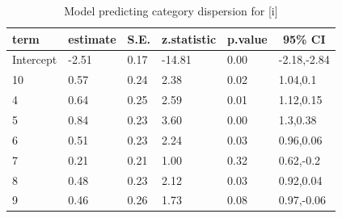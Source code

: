 \documentclass[
]{article}
\begin{document}
\begin{table}[tbp]

\begin{center}
\begin{threeparttable}

\caption{\label{tab:RMS-model-tbl-i}Model predicting category dispersion for [i]}

\begin{tabular}{llllll}
\toprule
term & \multicolumn{1}{c}{estimate} & \multicolumn{1}{c}{S.E.} & \multicolumn{1}{c}{z.statistic} & \multicolumn{1}{c}{p.value} & \multicolumn{1}{c}{95\% CI}\\
\midrule
Intercept & -2.51 & 0.17 & -14.81 & 0.00 & -2.18,-2.84\\
10 & 0.57 & 0.24 & 2.38 & 0.02 & 1.04,0.1\\
4 & 0.64 & 0.25 & 2.59 & 0.01 & 1.12,0.15\\
5 & 0.84 & 0.23 & 3.60 & 0.00 & 1.3,0.38\\
6 & 0.51 & 0.23 & 2.24 & 0.03 & 0.96,0.06\\
7 & 0.21 & 0.21 & 1.00 & 0.32 & 0.62,-0.2\\
8 & 0.48 & 0.23 & 2.12 & 0.03 & 0.92,0.04\\
9 & 0.46 & 0.26 & 1.73 & 0.08 & 0.97,-0.06\\
\bottomrule
\end{tabular}

\end{threeparttable}
\end{center}

\end{table}
\end{document}
